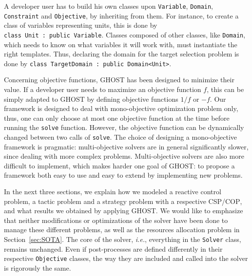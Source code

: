 \documentclass[journal]{IEEEtran}
\newcommand{\csp}{\textsc{CSP}\xspace}
\newcommand{\cop}{\textsc{COP}\xspace}
\newcommand{\ghost}{\textsc{GHOST}\xspace}
\newcommand{\ie}{\textit{i.e.}}
\begin{document}
A developer user has to  build his own classes upon \texttt{Variable},
\texttt{Domain},   \texttt{Constraint}   and  \texttt{Objective},   by
inheriting from  them. For  instance, to create  a class  of variables
representing        units,        this        is        done        by
\texttt{class~Unit~:~public~Variable}.   Classes   composed  of  other
classes, like \texttt{Domain}, which needs to know on what variables it
will work with, must instantiate  the right templates. Thus, declaring
the   domain   for  the   target   selection   problem  is   done   by
\texttt{class~TargetDomain~:~public~Domain<Unit>}.

Concerning objective  functions, \ghost has been  designed to minimize
their  value.  If  a developer  user  needs to  maximize an  objective
function $f$,  this can be  simply adapted  to \ghost by  defining objective  functions  $1/f$ or $-f$.   Our  framework is  designed  to  deal  with
mono-objective optimization problem only, thus, one can only choose at
most  one   objective  function  at   the  time  before   running  the
\texttt{solve}  function.  However,  the   objective  function  can  be
dynamically changed between two calls of \texttt{solve}. The choice of
designing  a  mono-objective   framework  is  pragmatic:  multi-objective
solvers are in  general significantly slower, since  dealing with more
complex problems.  Multi-objective solvers  are also more difficult to
implement, which makes harder one goal  of \ghost: to propose a framework
both easy to use and easy to extend by implementing new problems.

In  the next  three sections,  we explain  how we  modeled a  reactive
control  problem, a  tactic  problem  and a  strategy  problem with  a
respective \csp/\cop, and what results we obtained by applying \ghost.
We would like to emphasize that neither modifications or optimizations of the
solver have been  done to manage these different problems, as well as the resources allocation problem in Section~\ref{sec:SOTA}.  The core of
the  solver, \ie,  everything  in the  \texttt{Solver} class,  remains
unchanged.  Even  if post-processes  are defined differently  in their
respective \texttt{Objective}  classes, the way they  are included and
called into the solver is rigorously the same.

\end{document}

